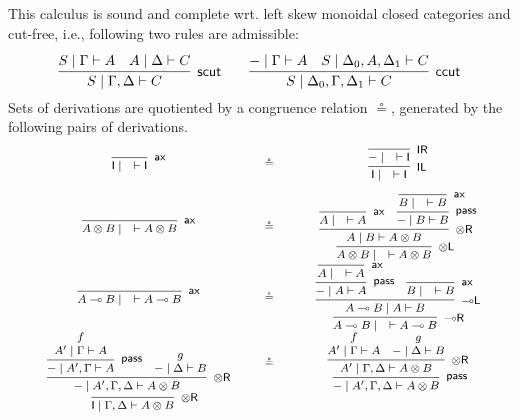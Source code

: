 \documentclass[sn-mathphys-num]{sn-jnl}%
\newcommand{\GG}{\Gamma}
\newcommand{\GD}{\Delta}
\newcommand{\vd}{\vdash}
\newcommand{\tl}{\otimes \mathsf{L}}
\newcommand{\tr}{\otimes\mathsf{R}}
\newcommand{\pass}{\mathsf{pass}}
\newcommand{\unitl}{\mathsf{IL}}
\newcommand{\unitr}{\mathsf{IR}}
\newcommand{\ax}{\mathsf{ax}}
\newcommand{\ot}{\otimes}
\newcommand{\lolli}{\multimap}
\newcommand{\lleft}{{\lolli}\mathsf{L}}
\newcommand{\lright}{{\lolli}\mathsf{R}}
\newcommand{\unit}{\mathsf{I}}
\newcommand{\proofbox}[1]{\begin{tabular}{l} #1 \end{tabular}}
\theoremstyle{thmstyleone}%
\theoremstyle{thmstyletwo}%
\theoremstyle{thmstylethree}%
\begin{document}
This calculus is sound and complete wrt. left skew monoidal closed categories and cut-free, i.e., following two rules are admissible:
\begin{displaymath}
      \infer[\mathsf{scut}]{S \mid \Gamma , \Delta \vd C}{
        \deduce{S \mid \Gamma \vd A}{}
        &
        \deduce{A \mid \Delta \vd C}{}
      }
      \qquad
      \infer[\mathsf{ccut}]{S \mid \Delta_0 , \Gamma , \Delta_1 \vd C}{
        \deduce{{-} \mid \Gamma \vd A}{}
        &
        \deduce{S \mid \Delta_0 , A , \Delta_1 \vd C}{}
      }
    \end{displaymath}
Sets of derivations are quotiented by a congruence relation $\circeq$, generated by the following pairs of derivations.
\begin{displaymath}
\label{fig:circeq}
\footnotesize\begin{array}{ccc}
    \proofbox{
      \infer[\ax]{\unit \mid \quad \vd \unit}{}
    }
  \quad 
  &\circeq&
  \quad
  \proofbox{
     \infer[\unitl]{\unit \mid \quad \vd \unit}{
    \infer[\unitr]{{-} \mid \quad \vd \unit}{}
   }
  }
  \\[15pt]
  \proofbox{
    \infer[\ax]{A \ot B \mid \quad \vd A \ot B}{}
  }
  \quad
  &\circeq&
  \quad
  \proofbox{
    \infer[\tl]{A \ot B \mid \quad \vd A \ot B}{
      \infer[\tr]{A \mid B \vd A \ot B}{
        \infer[\ax]{A \mid \quad \vd A}{}
        &
        \infer[\pass]{{-} \mid B \vd B}{
          \infer[\ax]{B \mid \quad \vd B}{}
        }
      }
    }
  }
  \\[15pt]
  \proofbox{
    \infer[\ax]{A \lolli B \mid \quad \vd A \lolli B}{}
  }
  \quad 
  &\circeq&
  \quad
  \proofbox{
    \infer[\lright]{A \lolli B \mid \quad \vd A \lolli B}{
      \infer[\lleft]{A \lolli B \mid A \vd B}{
        \infer[\pass]{{-} \mid A \vd A}{
          \infer[\ax]{A \mid \quad \vd A}{}
        }
        &
        \infer[\ax]{B \mid \quad \vd B}{}
      }
    }
  }
  \\[15pt]
  \proofbox{
    \infer[\tr]{{-} \mid A' , \GG , \GD \vd A \ot B}{
      \infer[\pass]{{-} \mid A' , \GG \vd A}{
        \deduce{A' \mid \GG \vd A}{f}
      }
      &
      \deduce{{-} \mid \GD \vd B}{g}
    }
  }
  \quad
  &\circeq&
  \quad
  \proofbox{
    \infer[\pass]{{-} \mid A' , \GG , \GD \vd A \ot B}{
      \infer[\tr]{A' \mid \GG , \GD \vd A \ot B}{
        \deduce{A' \mid \GG \vd A}{f}
        &
        \deduce{{-} \mid \GD \vd B}{g}
      }
    }
  }
  \\[15pt]
  \proofbox{
    \infer[\tr]{\unit \mid \GG , \GD \vd A \ot B}{
}}
\end{array}
\end{displaymath}
\end{document}
